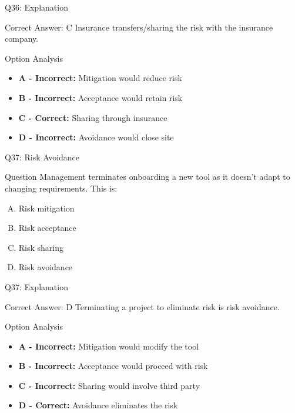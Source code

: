\documentclass{beamer}
\begin{document}
	\begin{frame}{Q36: Explanation}
		\begin{block}{Correct Answer: C}
			Insurance transfers/sharing the risk with the insurance company.
		\end{block}
		\begin{block}{Option Analysis}
			\begin{itemize}
				\item \textbf{A - Incorrect:} Mitigation would reduce risk
				\item \textbf{B - Incorrect:} Acceptance would retain risk
				\item \textbf{C - Correct:} Sharing through insurance
				\item \textbf{D - Incorrect:} Avoidance would close site
			\end{itemize}
		\end{block}
	\end{frame}
	
	\begin{frame}{Q37: Risk Avoidance}
		\begin{block}{Question}
			Management terminates onboarding a new tool as it doesn't adapt to changing requirements. This is:
		\end{block}
		\begin{enumerate}[(A)]
			\item Risk mitigation
			\item Risk acceptance
			\item Risk sharing
			\item Risk avoidance
		\end{enumerate}
	\end{frame}
	
	\begin{frame}{Q37: Explanation}
		\begin{block}{Correct Answer: D}
			Terminating a project to eliminate risk is risk avoidance.
		\end{block}
		\begin{block}{Option Analysis}
			\begin{itemize}
				\item \textbf{A - Incorrect:} Mitigation would modify the tool
				\item \textbf{B - Incorrect:} Acceptance would proceed with risk
				\item \textbf{C - Incorrect:} Sharing would involve third party
				\item \textbf{D - Correct:} Avoidance eliminates the risk
			\end{itemize}
		\end{block}
	\end{frame}
	
\end{document}
